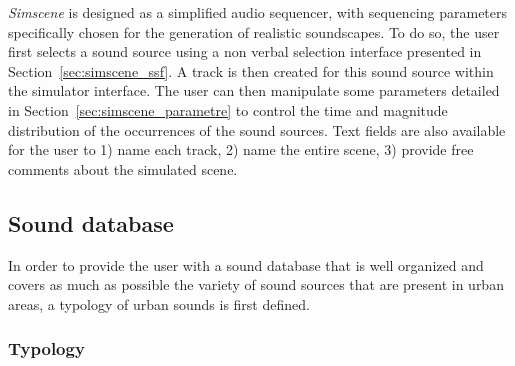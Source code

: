 \documentclass[12pt]{elsarticle}
\begin{document}
\emph{Simscene} is designed as a simplified audio sequencer, with sequencing parameters specifically chosen for the generation of realistic soundscapes. To do so, the user first selects a sound source using a non verbal selection interface presented in Section~\ref{sec:simscene_ssf}. A track is then created for this sound source within the simulator interface. The user can then manipulate some parameters detailed in Section~\ref{sec:simscene_parametre} to control the time and magnitude distribution of the occurrences of the sound sources. Text fields are also available for the user to 1) name each track, 2) name the entire scene, 3) provide free comments about the simulated scene.

\subsection{Sound database}
\label{sec:simscene_sampleDataSet}


In order to provide the user with a sound database that is well organized and covers as much as possible the variety of sound sources that are present in urban areas, a typology of urban sounds is first defined.

\subsubsection*{Typology}

\end{document}
